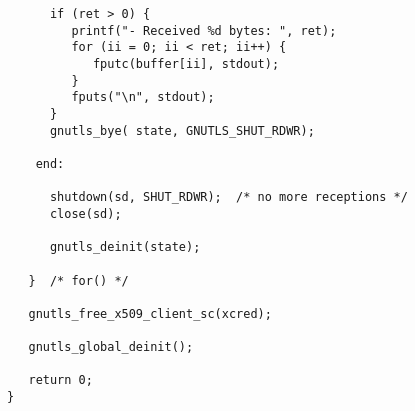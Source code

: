 \begin{verbatim}
      if (ret > 0) {
         printf("- Received %d bytes: ", ret);
         for (ii = 0; ii < ret; ii++) {
            fputc(buffer[ii], stdout);
         }
         fputs("\n", stdout);
      }
      gnutls_bye( state, GNUTLS_SHUT_RDWR);

    end:

      shutdown(sd, SHUT_RDWR);  /* no more receptions */
      close(sd);

      gnutls_deinit(state);

   }  /* for() */

   gnutls_free_x509_client_sc(xcred);

   gnutls_global_deinit();

   return 0;
}

\end{verbatim}
